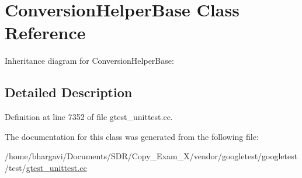 \hypertarget{class_conversion_helper_base}{}\section{Conversion\+Helper\+Base Class Reference}
\label{class_conversion_helper_base}


Inheritance diagram for Conversion\+Helper\+Base\+:


\subsection{Detailed Description}


Definition at line 7352 of file gtest\+\_\+unittest.\+cc.



The documentation for this class was generated from the following file\+:\begin{DoxyCompactItemize}
\item 
/home/bhargavi/\+Documents/\+S\+D\+R/\+Copy\+\_\+\+Exam\+\_\+X/vendor/googletest/googletest/test/\hyperlink{gtest__unittest_8cc}{gtest\+\_\+unittest.\+cc}\end{DoxyCompactItemize}
